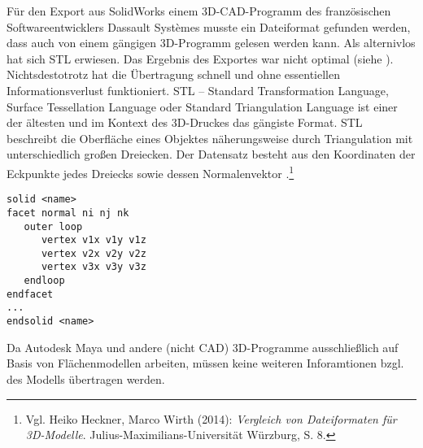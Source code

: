 Für den Export aus SolidWorks einem 3D-CAD-Programm des französischen Softwareentwicklers Dassault Systèmes musste ein Dateiformat gefunden werden, dass auch von einem gängigen 3D-Programm gelesen werden kann. Als alternivlos hat sich STL erwiesen. Das Ergebnis des Exportes war nicht optimal (siehe ). Nichtsdestotrotz hat die Übertragung schnell und ohne essentiellen Informationsverlust funktioniert.
STL -- Standard Transformation Language,  Surface Tessellation Language oder Standard Triangulation Language ist einer der ältesten und im Kontext des 3D-Druckes das gängiste Format.  
STL beschreibt die Oberfläche eines Objektes näherungsweise durch Triangulation mit unterschiedlich großen Dreiecken. Der Datensatz besteht aus den Koordinaten der Eckpunkte jedes Dreiecks sowie dessen Normalenvektor .\footnote{Vgl. Heiko Heckner, Marco Wirth (2014): \textit{Vergleich von Dateiformaten für 3D-Modelle}. Julius-Maximilians-Universität Würzburg, S. 8.}


\begin{lstlisting}[caption={STL ASCII Schema.}, captionpos=b, label={lst:STL ASCII}]
solid <name>
facet normal ni nj nk
   outer loop
      vertex v1x v1y v1z
      vertex v2x v2y v2z
      vertex v3x v3y v3z
   endloop
endfacet
...
endsolid <name>

\end{lstlisting}

Da Autodesk Maya und andere (nicht CAD) 3D-Programme ausschließlich auf Basis von Flächenmodellen arbeiten, müssen keine weiteren Inforamtionen bzgl. des Modells übertragen werden.